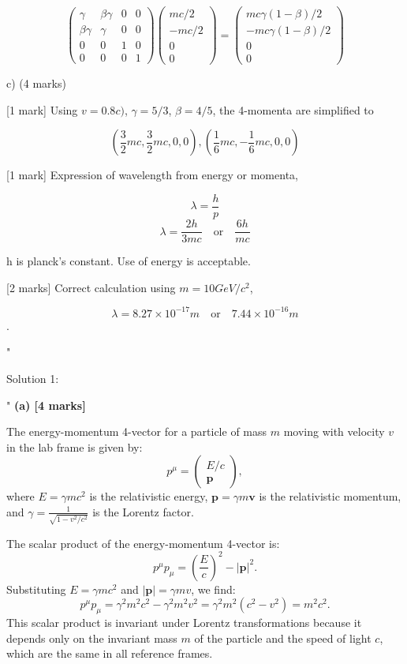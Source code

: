 \[
\begin{pmatrix} \gamma & \beta \gamma & 0 & 0 \\ \beta \gamma & \gamma & 0 & 0 \\ 0 & 0 & 1 & 0 \\ 0 & 0 & 0 & 1 \end{pmatrix} \begin{pmatrix} mc/2\\ -mc/2\\ 0\\ 0 \end{pmatrix} = \begin{pmatrix} mc \gamma (1-\beta) /2\\ -mc \gamma (1-\beta) /2\\ 0\\ 0 \end{pmatrix}
\]


c) (4 marks)

[1 mark] Using \( v = 0.8 c ) \), \( \gamma = 5 / 3 \), \( \beta = 4 / 5 \), the 4-momenta are simplified to 

\[ 
\left ( \frac{3}{2}mc, \frac{3}{2}mc, 0,0 \right), \left ( \frac{1}{6}mc, -\frac{1}{6}mc,0,0 \right)
\]

[1 mark] Expression of wavelength from energy or momenta, 

\[ \lambda  = \frac{h}{p} \]
\[ \lambda = \frac{2h}{3mc} \quad \text{or} \quad \frac{6h}{mc} \]

h is planck’s constant. Use of energy is acceptable. 

[2 marks] Correct calculation using \( m = 10 GeV / c^2 \), 

\[
\lambda = 8.27 \times 10^{-17} m \quad \text{or} \quad 7.44 \times 10^{-16} m
\].

"

Solution 1: 

"
\textbf{(a) [4 marks]} 

The energy-momentum 4-vector for a particle of mass \(m\) moving with velocity \(v\) in the lab frame is given by:
\[
p^\mu = \begin{pmatrix}
E/c \\
\mathbf{p}
\end{pmatrix},
\]
where \(E = \gamma m c^2\) is the relativistic energy, \(\mathbf{p} = \gamma m \mathbf{v}\) is the relativistic momentum, and \(\gamma = \frac{1}{\sqrt{1 - v^2/c^2}}\) is the Lorentz factor. 

The scalar product of the energy-momentum 4-vector is:
\[
p^\mu p_\mu = \left(\frac{E}{c}\right)^2 - |\mathbf{p}|^2.
\]
Substituting \(E = \gamma mc^2\) and \(|\mathbf{p}| = \gamma mv\), we find:
\[
p^\mu p_\mu = \gamma^2 m^2 c^2 - \gamma^2 m^2 v^2 = \gamma^2 m^2 (c^2 - v^2) = m^2 c^2.
\]
This scalar product is invariant under Lorentz transformations because it depends only on the invariant mass \(m\) of the particle and the speed of light \(c\), which are the same in all reference frames.

